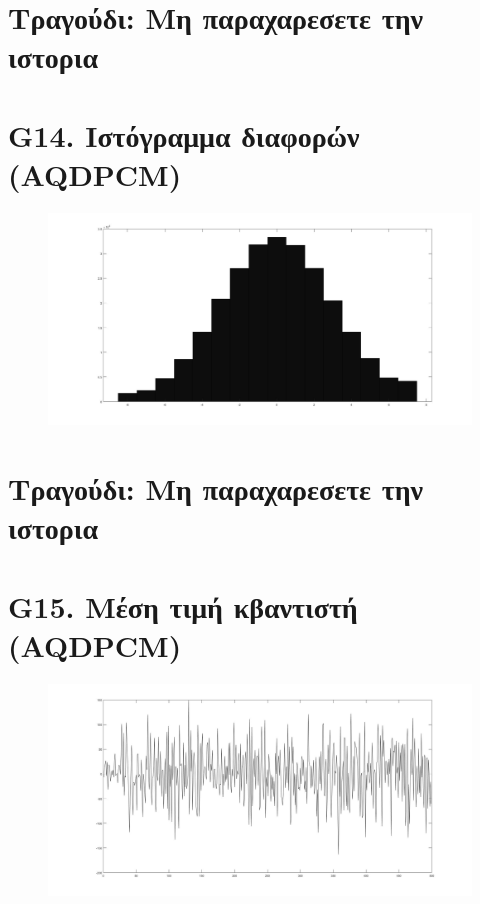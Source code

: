 \documentclass{article}
\begin{document}
\section*{Τραγούδι: Μη παραχαρεσετε την ιστορια}
\section*{G14. Ιστόγραμμα διαφορών (AQDPCM) }
\begin{figure}[h!]
 \begin{center}
 \advance\leftskip-6cm
  \includegraphics[width=230mm,scale=0.7]{g14s2.jpg}
\end{center}
\end{figure}
\newpage
\section*{Τραγούδι: Μη παραχαρεσετε την ιστορια}
\section*{G15. Μέση τιμή κβαντιστή (AQDPCM) }
\begin{figure}[h!]
 \begin{center}
 \advance\leftskip-6cm
  \includegraphics[width=230mm,scale=0.7]{g15s2.jpg}
\end{center}
\end{figure}
\newpage
\end{document}
